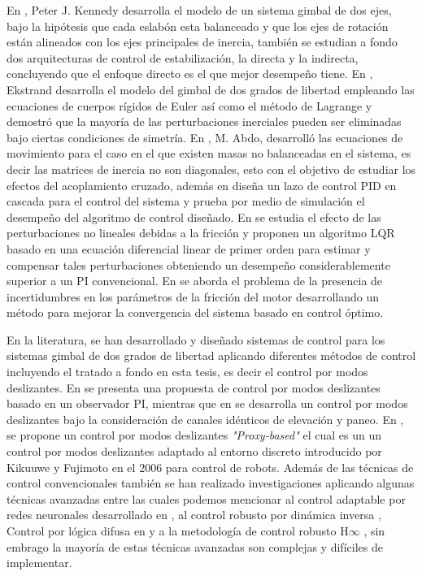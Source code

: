 En \cite{3}, Peter J. Kennedy desarrolla el modelo de un sistema gimbal de dos ejes, bajo la hip\'{o}tesis que cada eslab\'{o}n esta balanceado y que los ejes de rotaci\'{o}n est\'{a}n alineados con los ejes principales de inercia, tambi\'{e}n se estudian a fondo dos arquitecturas de control de estabilizaci\'{o}n, la directa y la indirecta, concluyendo que el enfoque directo es el que mejor desempe\~{n}o tiene. En \cite{4}, Ekstrand desarrolla el modelo del gimbal de dos grados de libertad empleando las ecuaciones de cuerpos r\'{i}gidos de Euler as\'{i} como el m\'{e}todo de Lagrange y demostr\'{o} que la mayor\'{i}a de las perturbaciones inerciales pueden ser eliminadas bajo ciertas condiciones de simetr\'{i}a. En \cite{5}, M. Abdo, desarroll\'{o} las ecuaciones de movimiento para el caso en el que existen masas no balanceadas en el sistema, es decir las matrices de inercia no son diagonales, esto con el objetivo de estudiar los efectos del acoplamiento cruzado, adem\'{a}s en \cite{6} dise\~{n}a un lazo de control PID en cascada para el control del sistema y prueba por medio de simulaci\'{o}n el desempe\~{n}o del algoritmo de control dise\~{n}ado. En \cite{10} se estudia el efecto de las perturbaciones no lineales debidas a la fricci\'{o}n y proponen un algoritmo LQR basado en una ecuaci\'{o}n diferencial linear de primer orden para estimar y compensar tales perturbaciones obteniendo un desempe\~{n}o considerablemente superior a un PI convencional. En \cite{11} se aborda el problema de la presencia de    incertidumbres en los par\'{a}metros de la fricci\'{o}n del motor desarrollando un m\'{e}todo para mejorar la convergencia del sistema basado en control \'{o}ptimo.

En la literatura, se han desarrollado y dise\~{n}ado sistemas de control para los sistemas gimbal de dos grados de libertad aplicando diferentes m\'{e}todos de control incluyendo el tratado a fondo en esta tesis, es decir el control por modos deslizantes. En \cite{12} se presenta una propuesta de control por modos deslizantes basado en un observador PI, mientras que en \cite{13} se desarrolla un control por modos deslizantes bajo la consideraci\'{o}n de canales id\'{e}nticos de elevaci\'{o}n y paneo. En \cite{14}, se propone un control por modos deslizantes \textit{"Proxy-based"} el cual es un un control por modos deslizantes adaptado al entorno discreto introducido por Kikuuwe y Fujimoto en el 2006 para control de robots. Adem\'{a}s de las t\'{e}cnicas de control convencionales tambi\'{e}n se han realizado investigaciones aplicando algunas t\'{e}cnicas avanzadas entre las cuales podemos mencionar al control adaptable por redes neuronales desarrollado en \cite{15}, al control robusto por din\'{a}mica inversa \cite{16}, Control por l\'{o}gica difusa en \cite{17} y a la metodolog\'{i}a de control robusto H$\infty$ \cite{18}, sin embrago la mayor\'{i}a de estas t\'{e}cnicas avanzadas son complejas y dif\'{i}ciles de implementar. 
